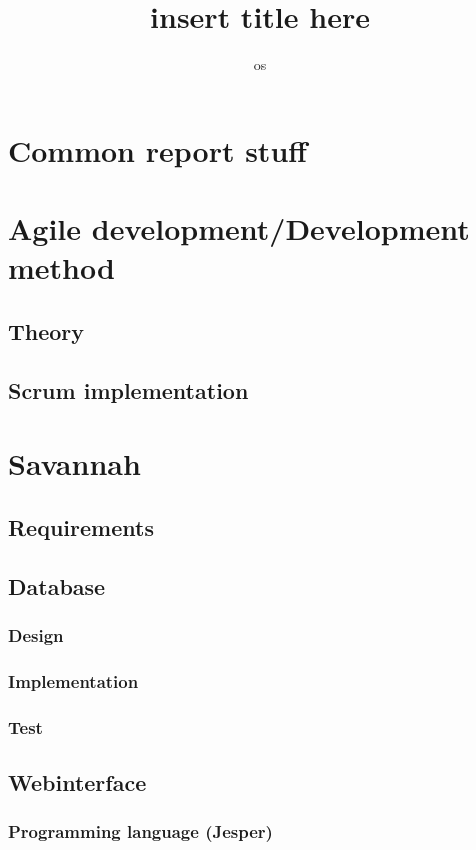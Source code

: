 

\title{insert title here} %
\author{os} %


\maketitle
\tableofcontents

\chapter{Common report stuff} %

\chapter{Agile development/Development method} %
 \section{Theory}
 \section{Scrum implementation}

\chapter{Savannah} %
  \section{Requirements}
  \section{Database}
    \subsection{Design}
    \subsection{Implementation}
    \subsection{Test}

  \section{Webinterface}
     \subsection{Programming language (Jesper)}
      
